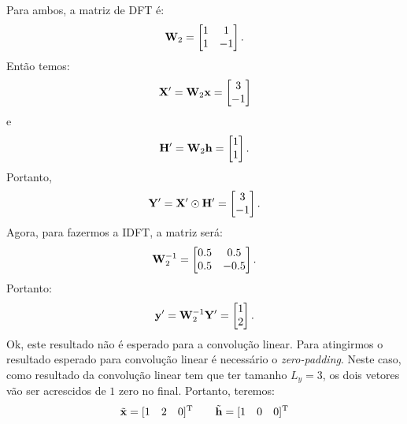 \documentclass{homeworkclass}
\begin{document}
\begin{homeworkProblem}
	Para ambos, a matriz de DFT é: 
	\begin{equation*} \mathbf{W}_{2} = 
	\begin{bmatrix} 
	1 & 1 \\ 
	1 & -1
	\end{bmatrix}.
	\end{equation*}
	Então temos:
	\begin{equation*}
	\mathbf{X}^{\prime} = \mathbf{W}_{2}\mathbf{x} = 	\begin{bmatrix} 
	                        3 \\ 
	                        -1
	                        \end{bmatrix}
	\end{equation*}
	e
		\begin{equation*}
	\mathbf{H}^{\prime} = \mathbf{W}_{2}\mathbf{h} = 	\begin{bmatrix} 
									1 \\ 
									1
									\end{bmatrix}.
	\end{equation*}
	Portanto,
	\begin{equation*}
	\mathbf{Y}^{\prime} = \mathbf{X}^{\prime}\odot\mathbf{H}^{\prime} = \begin{bmatrix} 
	3 \\ 
	-1
	\end{bmatrix}.
	\end{equation*}
	Agora, para fazermos a IDFT, a matriz será:
	\begin{equation*} \mathbf{W}_{2}^{-1} = 
		\begin{bmatrix} 
	0.5 & 0.5 \\ 
	0.5 & -0.5
	\end{bmatrix}.
	\end{equation*}
	Portanto:
	\begin{equation*}
	\mathbf{y}^{\prime} = \mathbf{W}_{2}^{-1} \mathbf{Y}^{\prime} = \begin{bmatrix} 
													1 \\ 
													2
													\end{bmatrix}.
	\end{equation*}
	Ok, este resultado não é esperado para a convolução linear. Para atingirmos o resultado esperado para convolução linear é necessário o \textit{zero-padding}. Neste caso, como resultado da convolução linear tem que ter tamanho $L_{y} = 3$, os dois vetores vão ser acrescidos de $1$ zero no final. Portanto, teremos:
	\begin{equation*}
	\xbftil = [1 \quad 2 \quad 0]^{\Trm} \qquad
	\hbftil = [1 \quad 0 \quad 0]^{\Trm}

\end{equation*}
\end{homeworkProblem}
\end{document}
